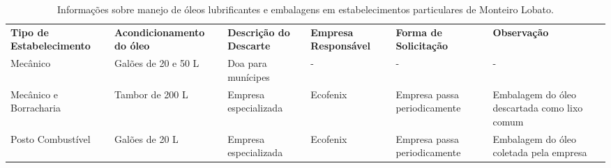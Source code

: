\begin{table}[htbp]
  \centering
  \caption{Informações sobre manejo de óleos lubrificantes e embalagens em estabelecimentos particulares de Monteiro Lobato. }
    \begin{tabular}{p{8.285em}|p{9.07em}|p{6.145em}|p{5.785em}|p{6.285em}|p{7.285em}}
    \rowcolor[rgb]{ .969,  .588,  .275} \textcolor[rgb]{ 1,  1,  1}{\textbf{Tipo de Estabelecimento}} & \textcolor[rgb]{ 1,  1,  1}{\textbf{Acondicionamento do óleo }} & \textcolor[rgb]{ 1,  1,  1}{\textbf{Descrição do Descarte}} & \textcolor[rgb]{ 1,  1,  1}{\textbf{Empresa Responsável}} & \textcolor[rgb]{ 1,  1,  1}{\textbf{Forma de Solicitação}} & \textcolor[rgb]{ 1,  1,  1}{\textbf{Observação}} \\
    \rowcolor[rgb]{ .992,  .914,  .851} Mecânico & Galões de 20 e 50 L & Doa para munícipes & -     & -     & - \\
    \rowcolor[rgb]{ .984,  .831,  .706} Mecânico e Borracharia & Tambor de 200 L & Empresa especializada & Ecofenix & Empresa passa periodicamente & Embalagem do óleo descartada como lixo comum \\
    \rowcolor[rgb]{ .992,  .914,  .851} Posto Combustível & Galões de 20 L & Empresa especializada & Ecofenix & Empresa passa periodicamente & Embalagem do óleo coletada pela empresa \\
    \end{tabular}%
  \label{tab:manejo_oleo}%
\end{table}%
